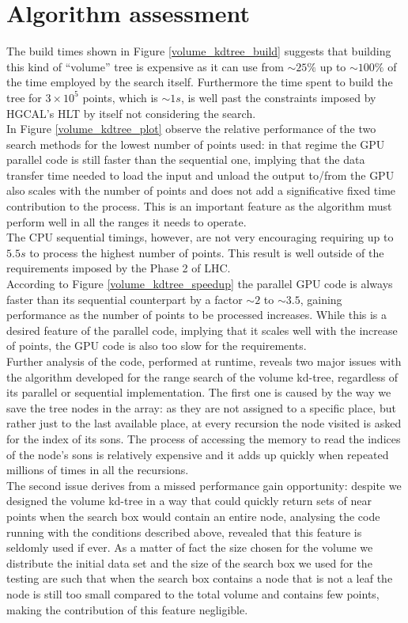 \section{Algorithm assessment}\label{sec:volumeKdAssessment}
The build times shown in Figure \ref{volume_kdtree_build} suggests that building this kind of ``volume'' tree is expensive as it can use from $\sim 25\%$ up to $\sim 100\%$ of the time employed by the search itself. Furthermore the time spent to build the tree for $3 \times 10^{5}$ points, which is $\sim 1\unit{s}$, is well past the constraints imposed by HGCAL's HLT by itself not considering the search.\\
In Figure \ref{volume_kdtree_plot} observe the relative performance of the two search methods for the lowest number of points used: in that regime the GPU parallel code is still faster than the sequential one, implying that the data transfer time needed to load the input and unload the output to/from the GPU also scales with the number of points and does not add a significative fixed time contribution to the process. This is an important feature as the algorithm must perform well in all the ranges it needs to operate.\\
The CPU sequential timings, however, are not very encouraging requiring up to $5.5 \unit{s}$ to process the highest number of points. This result is well outside of the requirements imposed by the Phase 2 of LHC.\\
According to Figure \ref{volume_kdtree_speedup} the parallel GPU code is always faster than its sequential counterpart by a factor $\sim 2$ to $\sim 3.5$, gaining performance as the number of points to be processed increases. While this is a desired feature of the parallel code, implying that it scales well with the increase of points, the GPU code is also too slow for the requirements.\\
Further analysis of the code, performed at runtime, reveals two major issues with the algorithm developed for the range search of the volume kd-tree, regardless of its parallel or sequential implementation. The first one is caused by the way we save the tree nodes in the array: as they are not assigned to a specific place, but rather just to the last available place, at every recursion the node visited is asked for the index of its sons. The process of accessing the memory to read the indices of the node's sons is relatively expensive and it adds up quickly when repeated millions of times in all the recursions.\\
The second issue derives from a missed performance gain opportunity: despite we designed the volume kd-tree in a way that could quickly return sets of near points when the search box would contain an entire node, analysing the code running with the conditions described above, revealed that this feature is seldomly used if ever. As a matter of fact the size chosen for the volume we distribute the initial data set and the size of the search box we used for the testing are such that when the search box contains a node that is not a leaf the node is still too small compared to the total volume and contains few points, making the contribution of this feature negligible.\\
